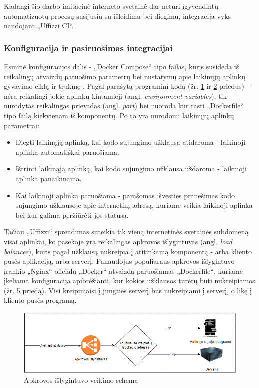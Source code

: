 \documentclass{VUMIFPSkursinis}
\begin{document}
Kadangi šio darbo imitacinė interneto svetainė dar neturi įgyvendintų automatizuotų procesų susijusių su išleidimu bei diegimu, integracija vyks naudojant „Uffizzi CI“.

    \subsubsection{Konfigūracija ir pasiruošimas integracijai}

Esminė konfigūracijos dalis - „Docker Compose“ tipo failas, kuris susideda iš reikalingų atvaizdų paruošimo parametrų bei nustatymų apie laikinųjų aplinkų gyvavimo ciklą ir trukmę \cite{SaltKeturioliktas}. Pagal parašytą programinį kodą (žr. \hyperref[priedas1]{1} ir \hyperref[priedas2]{2} priedus) - nėra reikalingi jokie aplinkų kintamieji (angl. \textit{environment variables}), tik nurodytas reikalingas prievadas (angl. \textit{port}) bei nuoroda kur rasti „Dockerfile“ tipo failą kiekvienam iš komponentų. Po to yra nurodomi laikinųjų aplinkų parametrai:

\begin{itemize}
  \item Diegti laikinąją aplinką, kai kodo sujungimo užklausa atidaroma - laikinoji aplinka automatiškai paruošiama.

  \item Ištrinti laikinąją aplinką, kai kodo sujungimo užklausa uždaroma - laikinoji aplinka panaikinama.

  \item Kai laikinoji aplinka paruošiama - parašomas išvesties pranešimas kodo sujungimo užklausoje apie internetinį adresą, kuriame veikia laikinoji aplinka bei kur galima peržiūrėti jos statusą.
  
\end{itemize}

Tačiau „Uffizzi“ sprendimas suteikia tik vieną internetinės svetainės subdomeną visai aplinkai, ko pasekoje yra reikalingas apkrovos išlygintuvas (angl. \textit{load balancer}), kuris pagal užklausą nukreipia į atitinkamą komponentą - arba kliento pusės aplikaciją, arba serverį. Panaudojus populiaraus apkrovos išlygintuvo įrankio „Nginx“ oficialų „Docker“ atvaizdą paruošiamas „Dockerfile“, kuriame įkeliama konfigūracija apibrėžianti, kur kokios užklausos turėtų būti nukreipiamos (žr. \hyperref[priedas5]{5 priedą}). Visi kreipimaisi į jungties serverį bus nukreipiami į serverį, o likę į kliento pusės programą.

\begin{figure}[H]
    \centering
    \includegraphics[scale=0.8]{img/lbschema.png}
    \caption{Apkrovos išlygintuvo veikimo schema}
    \label{img:mlp}
\end{figure}
\end{document}
